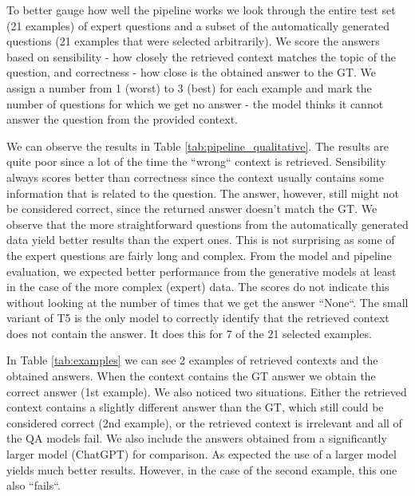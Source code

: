 \documentclass[fleqn,moreauthors,10pt]{ds_report}
\begin{document}
\noindent To better gauge how well the pipeline works we look through the entire test set (21 examples) of expert questions and a subset of the automatically generated questions (21 examples that were selected arbitrarily).
We score the answers based on sensibility - how closely the retrieved context matches the topic of the question, and correctness - how close is the obtained answer to the GT.
We assign a number from 1 (worst) to 3 (best) for each example and mark the number of questions for which we get no answer - the model thinks it cannot answer the question from the provided context.

\noindent We can observe the results in Table \ref{tab:pipeline_qualitative}.
The results are quite poor since a lot of the time the ``wrong`` context is retrieved.
Sensibility always scores better than correctness since the context usually contains some information that is related to the question. The answer, however, still might not be considered correct, since the returned answer doesn't match the GT.
We observe that the more straightforward questions from the automatically generated data yield better results than the expert ones.
This is not surprising as some of the expert questions are fairly long and complex.
From the model and pipeline evaluation, we expected better performance from the generative models at least in the case of the more complex (expert) data.
The scores do not indicate this without looking at the number of times that we get the answer ``None``.
The small variant of T5 is the only model to correctly identify that the retrieved context does not contain the answer. It does this for 7 of the 21 selected examples.

\noindent In Table \ref{tab:examples} we can see 2 examples of retrieved contexts and the obtained answers.
When the context contains the GT answer we obtain the correct answer (1st example).
We also noticed two situations. Either the retrieved context contains a slightly different answer than the GT, which still could be considered correct (2nd example), or the retrieved context is irrelevant and all of the QA models fail.
We also include the answers obtained from a significantly larger model (ChatGPT) for comparison. As expected the use of a larger model yields much better results. However, in the case of the second example, this one also ``fails``.

\end{document}
